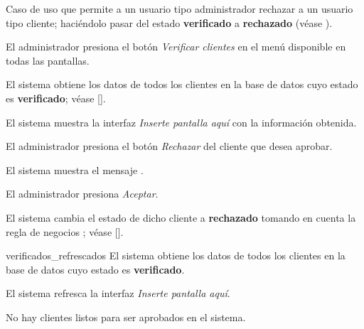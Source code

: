 %
%

{
  Caso de uso que permite a un usuario tipo administrador rechazar a un usuario
  tipo cliente; haciéndolo pasar del estado \textbf{verificado} a
  \textbf{rechazado} (véase ).

  \begin{trayectoriaPrincipal}

    \item El administrador presiona el botón \textit{Verificar clientes}
      en el menú disponible en todas las pantallas.

    \item El sistema obtiene los datos de todos los clientes en la base de datos
    cuyo estado es \textbf{verificado}; véase
    [].

    \item El sistema muestra la interfaz \textit{Inserte pantalla aquí} con la
      información obtenida.

    \item El administrador presiona el botón \textit{Rechazar} del cliente que
      desea aprobar.


    \item El sistema muestra el mensaje .

    \item El administrador presiona \textit{Aceptar}.

    \item El sistema cambia el estado de dicho cliente a \textbf{rechazado}
      tomando en cuenta la regla de negocios ;
      véase [].

    \item [verificados_refrescados] El sistema obtiene los datos de todos los
      clientes en la base de datos cuyo estado es \textbf{verificado}.

    \item El sistema refresca la interfaz \textit{Inserte pantalla aquí}.

  \end{trayectoriaPrincipal}

  \begin{trayectoriaAlternativa}
    {No hay clientes listos para ser aprobados en el sistema.}


\end{trayectoriaAlternativa}}
